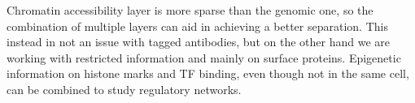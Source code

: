 Chromatin accessibility layer is more sparse than the genomic one, so
the combination of multiple layers can aid in achieving a better
separation. This instead in not an issue with tagged antibodies, but on
the other hand we are working with restricted information and mainly on
surface proteins. Epigenetic information on histone marks and TF
binding, even though not in the same cell, can be combined to study
regulatory networks.
